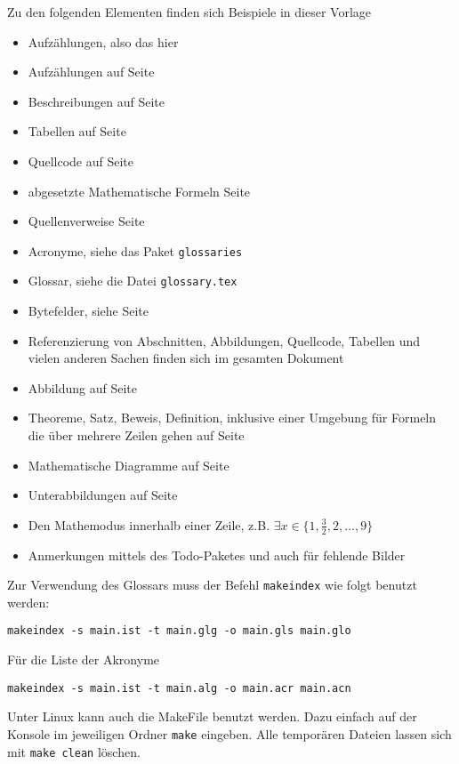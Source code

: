 Zu den folgenden Elementen finden sich Beispiele in dieser Vorlage
\begin{itemize}
    \item Aufzählungen, also das hier
	\item Aufzählungen auf Seite \pageref{example:enumeration}
	\item Beschreibungen auf Seite \pageref{example:description}
	\item Tabellen auf Seite \pageref{tab:table}
	\item Quellcode auf Seite \pageref{lst:useless}
	\item abgesetzte Mathematische Formeln Seite \pageref{eqn:formula}
	\item Quellenverweise Seite \pageref{example:reference}
	\item Acronyme, siehe das Paket \texttt{glossaries} 
	\item Glossar, siehe die Datei \texttt{glossary.tex}
	\item Bytefelder, siehe Seite \pageref{fig:bytefield}
	\item Referenzierung von Abschnitten, Abbildungen, Quellcode, Tabellen und vielen anderen Sachen finden sich im gesamten Dokument
	\item Abbildung auf Seite \pageref{fig:smiley}
	\item Theoreme, Satz, Beweis, Definition, inklusive einer Umgebung für Formeln die über mehrere Zeilen gehen auf Seite \pageref{example:theorem.multiline}
	\item Mathematische Diagramme auf Seite \pageref{example:diagram}
	\item Unterabbildungen auf Seite \pageref{fig:meth:bgsub:whole}
	\item Den Mathemodus innerhalb einer Zeile, z.B. $\exists x \in \{1,\frac{3}{2},2,\ldots,9\}$
	\item Anmerkungen mittels des Todo-Paketes \pageref{example:todo} und auch für fehlende Bilder \pageref{fig:meth:bgsub:whole}
\end{itemize}

Zur Verwendung des Glossars muss der Befehl \texttt{makeindex} wie folgt benutzt werden:
\begin{verbatim}
makeindex -s main.ist -t main.glg -o main.gls main.glo
\end{verbatim}
Für die Liste der Akronyme
\begin{verbatim}
makeindex -s main.ist -t main.alg -o main.acr main.acn
\end{verbatim}
Unter Linux kann auch die MakeFile benutzt werden. Dazu einfach auf der Konsole im jeweiligen Ordner \texttt{make} eingeben. 
Alle temporären Dateien lassen sich mit \texttt{make clean} löschen.

